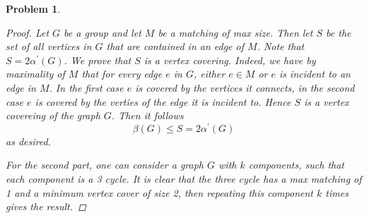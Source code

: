 \documentclass{article}
\newtheorem{prb}{Problem}
\begin{document}
\begin{prb} 
	\begin{proof} 
		Let $G$ be a group and let $M$ be a matching of max size. Then let $S$ be the set of all vertices in $G$ that are contained in an edge of $M$. 		Note that $S = 2\alpha^\prime(G)$. We prove that $S$ is a vertex covering. Indeed, we have by maximality of $M$ that for every edge $e$ in $G$, either $e \in M$ or 
		$e$ is incident to an edge in $M$. In the first case $e$ is covered by the vertices it connects, in the second case $e$ is covered by the verties of the edge it is incident to. Hence $S$ is a vertex covereing of the graph $G$. Then it follows 
		\[ \beta(G) \leq S = 2\alpha^\prime(G) \] 
		as desired. 

		For the second part, one can consider a graph $G$ with $k$ components, such that each component is a 3 cycle. 
		It is clear that the three cycle has a max matching of 1 and a minimum vertex cover of size 2, then 
		repeating this component $k$ times gives the result. 
	\end{proof}
\end{prb}
\end{document}
